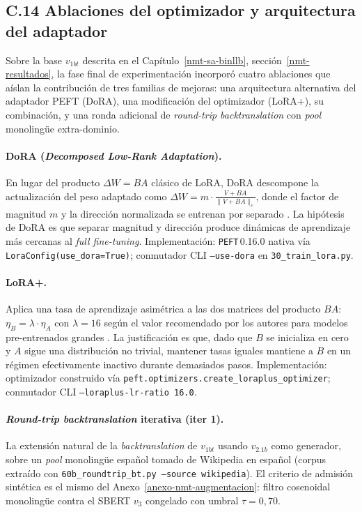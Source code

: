 \documentclass[12pt,a4paper,oneside]{book}
\begin{document}
\subsection*{C.14 Ablaciones del optimizador y arquitectura del adaptador}\label{anexo-nmt-ablaciones-peft}

Sobre la base \(v_{1bt}\) descrita en el Capítulo~\ref{nmt-sa-binllb}, sección~\ref{nmt-resultados}, la fase final de experimentación incorporó cuatro ablaciones que aíslan la contribución de tres familias de mejoras: una arquitectura alternativa del adaptador PEFT (DoRA), una modificación del optimizador (LoRA+), su combinación, y una ronda adicional de \emph{round-trip backtranslation} con \emph{pool} monolingüe extra-dominio.

\paragraph{DoRA (\emph{Decomposed Low-Rank Adaptation}).} En lugar del producto \(\Delta W = BA\) clásico de LoRA, DoRA descompone la actualización del peso adaptado como \(\Delta W = m \cdot \frac{V + BA}{\lVert V + BA \rVert_c}\), donde el factor de magnitud \(m\) y la dirección normalizada se entrenan por separado \parencite{liu2024dora}. La hipótesis de DoRA es que separar magnitud y dirección produce dinámicas de aprendizaje más cercanas al \emph{full fine-tuning}. Implementación: \texttt{PEFT}\,0.16.0 nativa vía \texttt{LoraConfig(use\_dora=True)}; conmutador CLI \texttt{--use-dora} en \texttt{30\_train\_lora.py}.

\paragraph{LoRA+.} Aplica una tasa de aprendizaje asimétrica a las dos matrices del producto \(BA\): \(\eta_B = \lambda \cdot \eta_A\) con \(\lambda=16\) según el valor recomendado por los autores para modelos pre-entrenados grandes \parencite{hayou2024loraplus}. La justificación es que, dado que \(B\) se inicializa en cero y \(A\) sigue una distribución no trivial, mantener tasas iguales mantiene a \(B\) en un régimen efectivamente inactivo durante demasiados pasos. Implementación: optimizador construido vía \texttt{peft.optimizers.create\_loraplus\_optimizer}; conmutador CLI \texttt{--loraplus-lr-ratio 16.0}.

\paragraph{\emph{Round-trip backtranslation} iterativa (iter 1).} La extensión natural de la \emph{backtranslation} de \(v_{1bt}\) usando \(v_{2.1b}\) como generador, sobre un \emph{pool} monolingüe español tomado de Wikipedia en español (corpus extraído con \texttt{60b\_roundtrip\_bt.py --source wikipedia}). El criterio de admisión sintética es el mismo del Anexo~\ref{anexo-nmt-augmentacion}: filtro cosenoidal monolingüe contra el SBERT \(v_3\) congelado con umbral \(\tau=0{,}70\).
\end{document}
